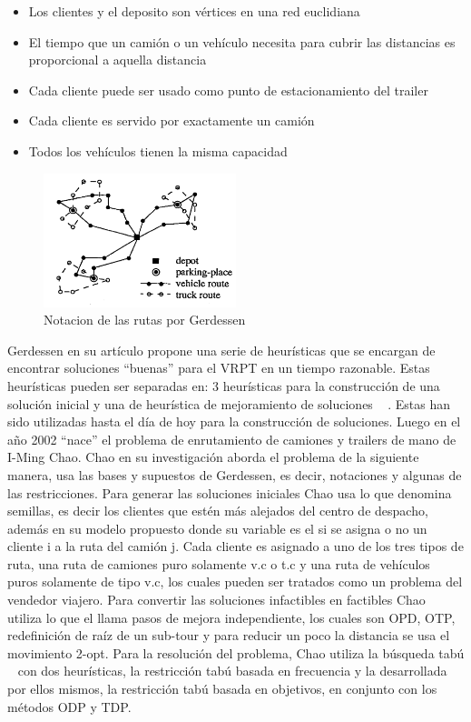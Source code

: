 \documentclass[letter, 10pt]{article}
\begin{document}
\begin{itemize}
    \item Los clientes  y el deposito son vértices en una red euclidiana
    \item El tiempo que un camión o un vehículo necesita para cubrir las distancias es proporcional a aquella distancia
    \item Cada cliente puede ser usado como punto de estacionamiento del trailer
    \item Cada cliente es servido por exactamente un camión
    \item Todos los vehículos tienen la misma capacidad
\end{itemize}

\begin{figure}[!htp]
\label{Tabla3}
\centering
\includegraphics[width=0.5\textwidth]{Images/fig7.png}
\caption{Notacion de las rutas por Gerdessen ~\cite{Gerdessen}} 
\end{figure}

Gerdessen en su artículo propone una serie de heurísticas que se encargan de encontrar soluciones ``buenas'' para el VRPT en un tiempo razonable. Estas heurísticas pueden ser separadas en: 3 heurísticas para la construcción de una solución inicial y una de heurística de mejoramiento de soluciones ~\cite{Gerdessen} . Estas han sido utilizadas hasta el día de hoy para la construcción de soluciones. Luego en el año 2002 ``nace'' el problema de enrutamiento de camiones y trailers de mano de I-Ming Chao.
Chao en su investigación aborda el problema de la siguiente manera, usa las bases y supuestos de Gerdessen, es decir, notaciones y algunas de las restricciones. Para generar las soluciones iniciales Chao usa lo que denomina semillas, es decir los clientes que estén más alejados del centro de despacho, además en su modelo propuesto donde su variable es el si se asigna o no un cliente i a la ruta del camión j. Cada cliente es asignado a uno de los tres tipos de ruta, una ruta de camiones puro solamente v.c o t.c y una ruta de vehículos puros solamente de tipo v.c, los cuales pueden ser tratados como un problema del vendedor viajero. Para convertir  las soluciones infactibles en factibles Chao ~\cite{Chao} utiliza lo que el llama pasos de mejora independiente, los cuales son OPD, OTP, redefinición de raíz de un sub-tour y para reducir un poco la distancia se usa el movimiento 2-opt. Para la resolución del problema, Chao utiliza la búsqueda tabú ~\cite{Glover} con dos heurísticas, la restricción tabú basada en frecuencia y la desarrollada por ellos mismos, la restricción tabú basada en objetivos, en conjunto con los métodos ODP y TDP.
\end{document}
